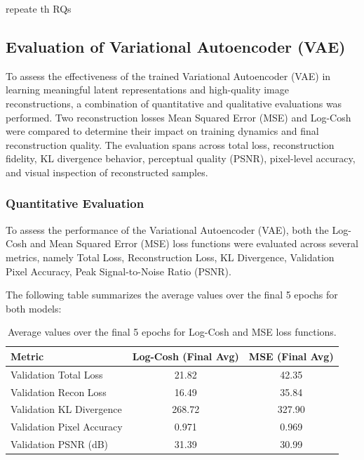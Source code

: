 repeate th RQs


\subsection{Evaluation of Variational Autoencoder (VAE)} \label{subsec:vae_evaluation}
To assess the effectiveness of the trained Variational Autoencoder (VAE) in learning meaningful latent representations and high-quality image reconstructions, a combination of quantitative and qualitative evaluations was performed. Two reconstruction losses Mean Squared Error (MSE) and Log-Cosh were compared to determine their impact on training dynamics and final reconstruction quality. The evaluation spans across total loss, reconstruction fidelity, KL divergence behavior, perceptual quality (PSNR), pixel-level accuracy, and visual inspection of reconstructed samples.

\subsubsection{Quantitative Evaluation}
To assess the performance of the Variational Autoencoder (VAE), both the Log-Cosh and Mean Squared Error (MSE) loss functions were evaluated across several metrics, namely Total Loss, Reconstruction Loss, KL Divergence, Validation Pixel Accuracy, Peak Signal-to-Noise Ratio (PSNR). 

The following table summarizes the average values over the final 5 epochs for both models:

\begin{table}[h]
    \centering
    \begin{tabular}{lcc}
        \toprule
        \textbf{Metric} & \textbf{Log-Cosh (Final Avg)} & \textbf{MSE (Final Avg)} \\
        \midrule
        Validation Total Loss & 21.82 & 42.35 \\
        Validation Recon Loss & 16.49 & 35.84 \\
        Validation KL Divergence & 268.72 & 327.90 \\
        Validation Pixel Accuracy & 0.971 & 0.969 \\
        Validation PSNR (dB) & 31.39 & 30.99 \\
        \bottomrule
    \end{tabular}
    \caption{Average values over the final 5 epochs for Log-Cosh and MSE loss functions.}
    \label{tab:vae_evaluation}
\end{table}

